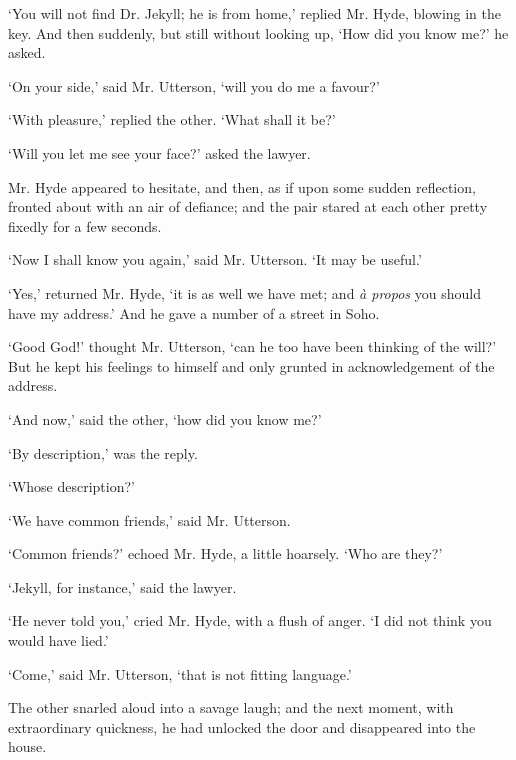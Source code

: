 \documentclass[]{novel}
\begin{document}
‘You will not find Dr. Jekyll; he is from home,’ replied Mr. Hyde, blowing in the key. And then suddenly, but still without looking up, ‘How did you know me?’ he asked.

‘On your side,’ said Mr. Utterson, ‘will you do me a favour?’

‘With pleasure,’ replied the other. ‘What shall it be?’

‘Will you let me see your face?’ asked the lawyer.

Mr. Hyde appeared to hesitate, and then, as if upon some sudden reflection, fronted about with an air of defiance; and the pair stared at each other pretty fixedly for a few seconds.

‘Now I shall know you again,’ said Mr. Utterson. ‘It may be useful.’

‘Yes,’ returned Mr. Hyde, ‘it is as well we have met; and \emph{à propos} you should have my address.’ And he gave a number of a street in Soho.

‘Good God!’ thought Mr. Utterson, ‘can he too have been thinking of the will?’ But he kept his feelings to himself and only grunted in acknowledgement of the address.

‘And now,’ said the other, ‘how did you know me?’

‘By description,’ was the reply.

‘Whose description?’

‘We have common friends,’ said Mr. Utterson.

‘Common friends?’ echoed Mr. Hyde, a little hoarsely. ‘Who are they?’

‘Jekyll, for instance,’ said the lawyer.

‘He never told you,’ cried Mr. Hyde, with a flush of anger. ‘I did not think you would have lied.’

‘Come,’ said Mr. Utterson, ‘that is not fitting language.’

The other snarled aloud into a savage laugh; and the next moment, with extraordinary quickness, he had unlocked the door and disappeared into the house.
\end{document}
